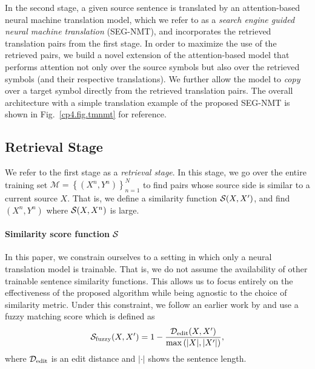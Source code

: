 In the second stage, a given source sentence is translated by an attention-based neural machine translation model, which we refer to as a {\it search engine guided neural machine translation} (SEG-NMT), and incorporates the retrieved translation pairs from the first stage. In order to maximize the use of the retrieved pairs, we build a novel extension of the attention-based model that performs attention not only over the source symbols but also over the retrieved symbols (and their respective translations). We further allow the model to \textit{copy} over a target symbol directly from the retrieved translation pairs. The overall architecture with a simple translation example of the proposed SEG-NMT is shown in Fig.~\ref{cp4.fig.tmnmt} for reference.




\subsection{Retrieval Stage}

We refer to the first stage as a {\it retrieval stage}. In this stage, we go over the entire training set $\mathcal{M}=\left\{ (X^n, Y^n)\right\}_{n=1}^N$ to find pairs whose source side is similar to a current source $X$. That is, we define a similarity function $\mathcal{S}(X, X')$, and find $(X^n, Y^n)$ where $\mathcal{S}(X, X^n)$ is large. 

\paragraph{Similarity score function $\mathcal{S}$}

In this paper, we constrain ourselves to a setting in which only a neural translation model is trainable. That is, we do not assume the availability of other trainable sentence similarity functions. This allows us to focus entirely on the effectiveness of the proposed algorithm while being agnostic to the choice of similarity metric. Under this constraint, we follow an earlier work by \citep{li2016phrase} and use a fuzzy matching score which is defined as 
\begin{align}
\label{cp4.eq.fuzzy}
\mathcal{S}_{\text{fuzzy}}(X, X') = 1 - \frac{\mathcal{D}_{\text{edit}}(X, X')}{\max\left(|X|, |X'|\right)},
\end{align}
where $\mathcal{D}_{\text{edit}}$ is an edit distance and $| \cdot |$ shows the sentence length. 

